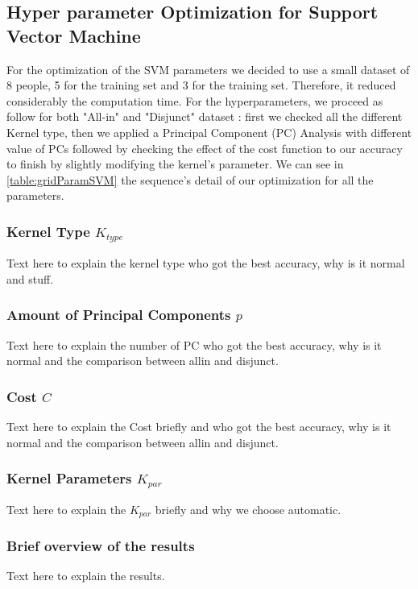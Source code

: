 \documentclass[conference]{IEEEtran}
\begin{document}
\subsection{Hyper parameter Optimization for Support Vector Machine}\label{sec:hyper:svm}
\textcolor{maxim}{
    For the optimization of the SVM parameters we decided to use a small dataset of 8 people, 5 for the training set and 3 for the training set. Therefore, it reduced considerably the computation time. For the hyperparameters, we proceed as follow for both "All-in" and "Disjunct" dataset : first we checked all the different Kernel type, then we applied a Principal Component (PC) Analysis with different value of PCs followed by checking the effect of the cost function to our accuracy to finish by slightly modifying the kernel's parameter. We can see in \ref{table:gridParamSVM} the sequence's detail of our optimization for all the parameters.\\
    \subsubsection{Kernel Type $K_{type}$}
    Text here to explain the kernel type who got the best accuracy, why is it normal and stuff. \\
    \subsubsection{Amount of Principal Components $p$}
    Text here to explain the number of PC who got the best accuracy, why is it normal and the comparison between allin and disjunct. \\
    \subsubsection{Cost $C$}
    Text here to explain the Cost briefly and who got the best accuracy, why is it normal and the comparison between allin and disjunct. \\
    \subsubsection{Kernel Parameters $K_{par}$}
    Text here to explain the $K_{par}$ briefly and why we choose automatic.\\
    \subsubsection{Brief overview of the results}
    Text here to explain the results.\\
}
\end{document}
